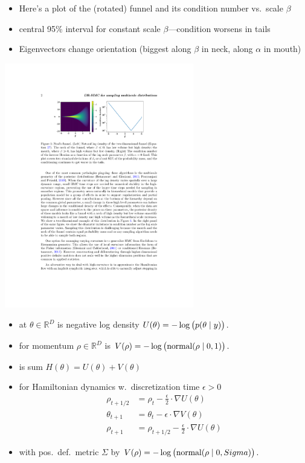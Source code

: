 \documentclass[10pt]{report}
\begin{document}
\begin{itemize}
\item Here's a plot of the (rotated) funnel and its condition number
  vs.\ scale $\beta$
\item central 95\% interval for constant scale $\beta$---condition
  worsens in tails
\item Eigenvectors change orientation (biggest along $\beta$ in neck,
  along $\alpha$ in mouth)
\end{itemize}
\begin{center}
  \includegraphics[width=3.25in]{img/funnel-condition.pdf}
\end{center}

\begin{itemize}
\item {} at $\theta \in \mathbb{R}^D$ is negative log density $U(\theta) = -\log
  \left( \strut p(\theta \mid y) \right)$.
\item {} for momentum $\rho \in \mathbb{R}^D$ is
  $V(\rho) = -\log \left( \strut \textrm{normal}(\rho \mid 0, 1) \right).$
\item {} is sum $H(\theta) = U(\theta) + V(\theta)$
\item {} for Hamiltonian dynamics w.\
discretization time $\epsilon > 0$
\begin{align*}
  \rho_{t+1/2} &= \rho_t - \frac{\epsilon}{2} \cdot \nabla U(\theta)
  \\
  \theta_{t + 1} &= \theta_t - \epsilon \cdot \nabla V(\theta)
  \\
  \rho_{t+1} &= \rho_{t + 1/2} - \frac{\epsilon}{2} \cdot \nabla U(\theta)
\end{align*}
\item {} with pos.\ def.\ metric $\Sigma$ by $V(\rho) =
  -\log \left( \strut \textrm{normal}(\rho \mid 0, Sigma) \right).$
\end{itemize}
\end{document}
